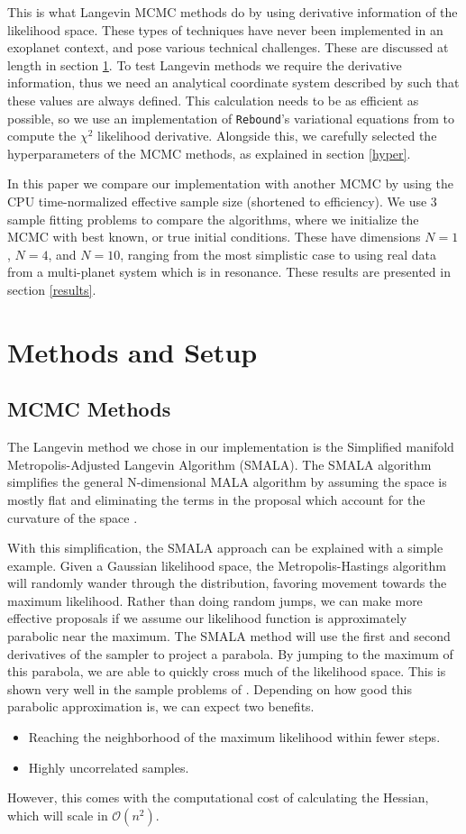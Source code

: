 \documentclass{aa}
\begin{document}
This is what Langevin MCMC methods do by using derivative information of the likelihood space. These types of techniques have never been implemented in an exoplanet context, and pose various technical challenges. These are discussed at length in section \ref{setup}. To test Langevin methods we require the derivative information, thus we need an analytical coordinate system described by \cite{Pl2009} such that these values are always defined. This calculation needs to be as efficient as possible, so we use an implementation of \texttt{Rebound}'s variational equations from \cite{Rein2016} to compute the $\chi^2$ likelihood derivative. Alongside this, we carefully selected the hyperparameters of the MCMC methods, as explained in section \ref{hyper}.

In this paper we compare our implementation with another MCMC by using the CPU time-normalized effective sample size (shortened to efficiency). We use 3 sample fitting problems to compare the algorithms, where we initialize the MCMC with best known, or true initial conditions. These have dimensions $N=1$, $N=4$, and $N=10$, ranging from the most simplistic case to using real data from a multi-planet system which is in resonance. These results are presented in section \ref{results}.
 
\section{Methods and Setup}\label{setup}
\subsection{MCMC Methods}
The Langevin method we chose in our implementation is the Simplified manifold Metropolis-Adjusted Langevin Algorithm (SMALA). The SMALA algorithm simplifies the general N-dimensional MALA algorithm by assuming the space is mostly flat and eliminating the terms in the proposal which account for the curvature of the space \cite{Girolami2011}.

With this simplification, the SMALA approach can be explained with a simple example. Given a Gaussian likelihood space, the Metropolis-Hastings algorithm will randomly wander through the distribution, favoring movement towards the maximum likelihood.
Rather than doing random jumps, we can make more effective proposals if we assume our likelihood function is approximately parabolic near the maximum. The SMALA method will use the first and second derivatives of the sampler to project a parabola. By jumping to the maximum of this parabola, we are able to quickly cross much of the likelihood space. This is shown very well in the sample problems of \cite{Girolami2011}. Depending on how good this parabolic approximation is, we can expect two benefits.
\begin{itemize}
\item Reaching the neighborhood of the maximum likelihood within fewer steps.
\item Highly uncorrelated samples.
\end{itemize}
However, this comes with the computational cost of calculating the Hessian, which will scale in $\mathcal{O}(n^2)$.
\end{document}
